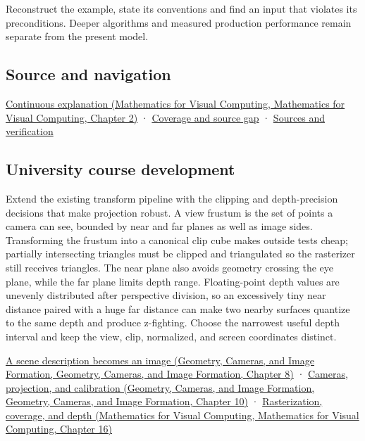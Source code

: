 Reconstruct the example, state its conventions and find an input that violates its preconditions. Deeper algorithms and measured production performance remain separate from the present model.

\subsection{Source and navigation}\label{appendix-1c07d64f5e70-source-and-navigation}

\href{../02-Mathematics-for-Visual-Computing/main.pdf\#nameddest=01-foundations-i-ch018-keep-the-promises-visible-while-moving-between-representations}{Continuous explanation (Mathematics for Visual Computing, Mathematics for Visual Computing, Chapter 2)} · \hyperref[appendix-fd090d982a15-phase-7---parts-601-700]{Coverage and source gap} · \hyperref[appendix-a103e7846d21-phase-7---source-analysis-and-verification]{Sources and verification}

\subsection{University course development}\label{appendix-1c07d64f5e70-university-course-development}

Extend the existing transform pipeline with the clipping and depth-precision decisions that make projection robust. A view frustum is the set of points a camera can see, bounded by near and far planes as well as image sides. Transforming the frustum into a canonical clip cube makes outside tests cheap; partially intersecting triangles must be clipped and triangulated so the rasterizer still receives triangles. The near plane also avoids geometry crossing the eye plane, while the far plane limits depth range. Floating-point depth values are unevenly distributed after perspective division, so an excessively tiny near distance paired with a huge far distance can make two nearby surfaces quantize to the same depth and produce z-fighting. Choose the narrowest useful depth interval and keep the view, clip, normalized, and screen coordinates distinct.

\href{../03-Geometry-Cameras-and-Image-Formation/main.pdf\#nameddest=03-visual-computing-i-ch001-a-scene-description-becomes-an-image}{A scene description becomes an image (Geometry, Cameras, and Image Formation, Geometry, Cameras, and Image Formation, Chapter 8)} · \href{../03-Geometry-Cameras-and-Image-Formation/main.pdf\#nameddest=03-visual-computing-i-ch003-cameras-projection-and-calibration}{Cameras, projection, and calibration (Geometry, Cameras, and Image Formation, Geometry, Cameras, and Image Formation, Chapter 10)} · \href{../02-Mathematics-for-Visual-Computing/main.pdf\#nameddest=03-visual-computing-i-ch012-rasterization-coverage-and-depth}{Rasterization, coverage, and depth (Mathematics for Visual Computing, Mathematics for Visual Computing, Chapter 16)}

